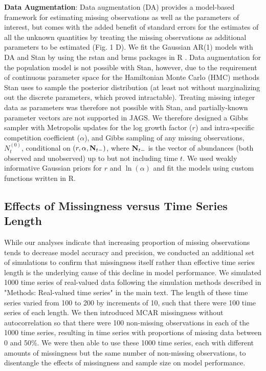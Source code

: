 \documentclass[12pt,english]{article} %
\begin{document}
\textbf{Data Augmentation}: Data augmentation (DA) provides a model-based framework for estimating missing observations as well as the parameters of interest, but comes with the added benefit of standard errors for the estimates of all the unknown quantities by treating the missing observations as additional parameters to be estimated (Fig. 1 D). We fit the Gaussian AR(1) models with DA and Stan \citep{carpenter_stan_2017} by using the rstan \citep{rstan_package} and brms \citep{burkner2017brms} packages in R \citep{r_2021}. Data augmentation for the population model is not possible with Stan, however, due to the requirement of continuous parameter space for the Hamiltonian Monte Carlo (HMC) methods Stan uses to sample the posterior distribution (at least not without marginalizing out the discrete parameters, which proved intractable). Treating missing integer data as parameters was therefore not possible with Stan, and partially-known parameter vectors are not supported in JAGS. We therefore designed a Gibbs sampler with Metropolis updates for the log growth factor ($r$) and intra-specific competition coefficient ($\alpha$), and Gibbs sampling of any missing observations, $N_{t}^{(0)}$, conditional on $(r, \alpha, {\bf N}_{t-})$, where ${\bf N}_{t-}$ is the vector of abundances (both observed and unobserved) up to but not including time $t$. We used weakly informative Gaussian priors for $r$ and $\ln(\alpha)$ and fit the models using custom functions written in R. 


\subsection*{Effects of Missingness versus Time Series Length}
While our analyses indicate that increasing proportion of missing observations tends to decrease model accuracy and precision, we conducted an additional set of simulations to confirm that missingness itself rather than effective time series length is the underlying cause of this decline in model performance. We simulated 1000 time series of real-valued data following the simulation methods described in "Methods: Real-valued time series" in the main text. The length of these time series varied from 100 to 200 by increments of 10, such that there were 100 time series of each length. We then introduced MCAR missingness without autocorrelation so that there were 100 non-missing observations in each of the 1000 time series, resulting in time series with proportions of missing data between 0 and 50\%. We were then able to use these 1000 time series, each with different amounts of missingness but the same number of non-missing observations, to disentangle the effects of missingness and sample size on model performance. 
\end{document}
